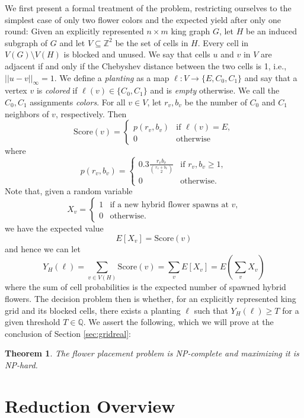 \documentclass[11pt]{article}
\theoremstyle{plain}
\newtheorem*{theorema}{Theorem}
\begin{document}
We first present a formal treatment of the problem, restricting ourselves to the simplest case of only two flower colors and the expected yield after only one round: Given an explicitly represented $n \times m$ king graph $G$, let $H$ be an induced subgraph of $G$ and let $V \subseteq \mathbb{Z}^2$ be the set of cells in $H$. Every cell in $V(G) \setminus V(H)$ is blocked and unused. We say that cells $u$ and $v$ in $V$ are adjacent if and only if the Chebyshev distance between the two cells is 1, i.e., $||u-v||_{\infty} = 1$. 
We define a \emph{planting} as a map $\ell: V \to \{E, C_0, C_1\}$ and say that a vertex $v$ is \emph{colored} if $\ell(v) \in \{C_0, C_1\}$ and is \emph{empty} otherwise. We call the $C_0, C_1$ assignments \emph{colors}. For all $v \in V$, let $r_v, b_v$ be the number of $C_0$ and $C_1$ neighbors of $v$, respectively. Then 
\[\mathrm{Score}(v) = \begin{cases}
    p(r_v, b_v) & \text{if } \ell (v) = E, \\
    0  & \text{otherwise}
\end{cases}\]
where 
\[
p(r_v, b_v) = \begin{cases}
    0.3\frac{r_v b_v}{\binom{r_v + b_v}{2}} & \text{if } r_v, b_v \geq 1, \\
    0 & \text{otherwise.}
\end{cases}
\]
Note that, given a random variable 
\[
X_v = \begin{cases}
    1 &\text{if a new hybrid flower spawns at $v$,}\\
    0 &\text{otherwise.}
\end{cases}
\]
we have the expected value
\[E[X_v] = \mathrm{Score}(v)\]
and hence we can let
\[
Y_H(\ell)=\sum_{v\in V(H)}\mathrm{Score}(v) = \sum_vE[X_v] = E(\sum_v X_v)
\]
where the sum of cell probabilities is the expected number of spawned hybrid flowers. The decision problem then is whether, for an explicitly represented king grid and its blocked cells, there exists a planting $\ell$ such that $Y_H(\ell) \geq T$ for a given threshold $T \in \mathbb{Q}$. 
We assert the following, which we will prove at the conclusion of Section \ref{sec:gridreal}:

\begin{theorema}
    The flower placement problem is NP-complete and maximizing it is NP-hard.
\end{theorema}

\section{Reduction Overview}
\end{document}
